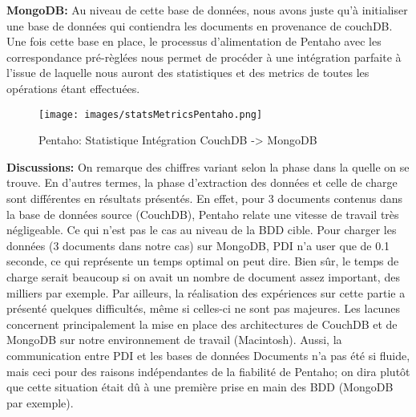\documentclass[12pt,a4wide,twoside]{report}
\begin{document}
\textbf{MongoDB:}\newline
Au niveau de cette base de données, nous avons juste qu'à initialiser une base de données qui contiendra les documents en provenance de couchDB. Une fois cette base en place, le processus d'alimentation de Pentaho avec les correspondance pré-règlées nous permet de procéder à une intégration parfaite à l'issue de laquelle nous auront des statistiques et des metrics de toutes les opérations étant effectuées. \newline
		\begin{figure}[!h]
	\begin{center}
		\texttt{[image: images/statsMetricsPentaho.png]}
	\end{center}
		\caption{Pentaho: Statistique Intégration CouchDB -> MongoDB}
	\end{figure}
	
	
\textbf{Discussions: } On remarque des chiffres variant selon la phase dans la quelle on se trouve. En d'autres termes, la phase d'extraction des données et celle de charge sont différentes en résultats présentés. En effet, pour 3 documents contenus dans la base de données source (CouchDB), Pentaho relate une vitesse de travail très négligeable. Ce qui n'est pas le cas au niveau de la BDD cible. Pour charger les données (3 documents dans notre cas) sur MongoDB, PDI n'a user que de 0.1 seconde, ce qui représente un temps optimal on peut dire. Bien sûr, le temps de charge serait beaucoup  si on avait un nombre de document assez important, des milliers par exemple.\newline
Par ailleurs, la réalisation des expériences sur cette partie a présenté quelques difficultés, même si celles-ci ne sont pas majeures. Les lacunes concernent principalement la mise en place des architectures de CouchDB et de MongoDB sur notre environnement de travail (Macintosh). Aussi, la communication entre PDI et les bases de données Documents n'a pas été si fluide, mais ceci pour des raisons indépendantes de la fiabilité de Pentaho; on dira plutôt que cette situation était dû à une première prise en main des BDD (MongoDB par exemple).
  \newpage

	

\end{document}

